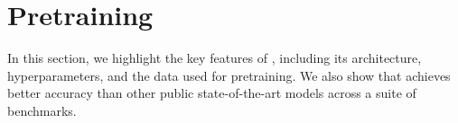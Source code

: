 \section{Pretraining}
\label{sec:pretraining}

In this section, we highlight the key features of \ourbasemodel, including its architecture, hyperparameters, and the data used for pretraining. We also show that \ourbasemodel achieves better accuracy than other public state-of-the-art models across a suite of benchmarks.





